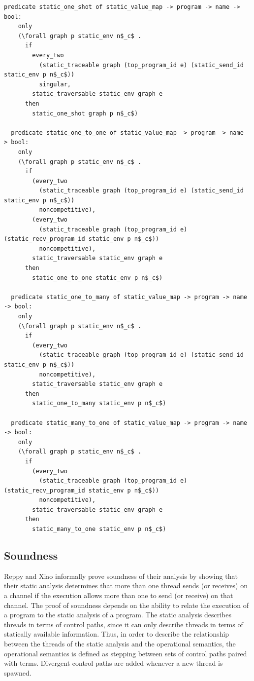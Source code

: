 \documentclass[10pt]{article}
\begin{document}
\begin{lstlisting}[language=logic, mathescape]
  predicate static_one_shot of static_value_map -> program -> name -> bool:
    only
    (\forall graph p static_env n$_c$ .
      if
        every_two
          (static_traceable graph (top_program_id e) (static_send_id static_env p n$_c$))
          singular,
        static_traversable static_env graph e
      then
        static_one_shot graph p n$_c$)

  predicate static_one_to_one of static_value_map -> program -> name -> bool:
    only
    (\forall graph p static_env n$_c$ .
      if
        (every_two
          (static_traceable graph (top_program_id e) (static_send_id static_env p n$_c$))
          noncompetitive), 
        (every_two
          (static_traceable graph (top_program_id e) (static_recv_program_id static_env p n$_c$))
          noncompetitive), 
        static_traversable static_env graph e
      then
        static_one_to_one static_env p n$_c$)

  predicate static_one_to_many of static_value_map -> program -> name -> bool:
    only
    (\forall graph p static_env n$_c$ .
      if
        (every_two
          (static_traceable graph (top_program_id e) (static_send_id static_env p n$_c$))
          noncompetitive),
        static_traversable static_env graph e
      then
        static_one_to_many static_env p n$_c$) 

  predicate static_many_to_one of static_value_map -> program -> name -> bool:
    only
    (\forall graph p static_env n$_c$ .
      if
        (every_two
          (static_traceable graph (top_program_id e) (static_recv_program_id static_env p n$_c$))
          noncompetitive),
        static_traversable static_env graph e
      then
        static_many_to_one static_env p n$_c$) 
\end{lstlisting}

\subsection{Soundness}

Reppy and Xiao informally prove soundness of their analysis by showing that their static analysis
determines that more than one thread sends (or receives) on a channel if the execution allows more
than one to send (or receive) on that channel. The proof of soundness depends on the
ability to relate the execution of a program to the static analysis of a program. The static
analysis describes threads in terms of control paths, since it can only describe threads in
terms of statically available information. Thus, in order to describe the relationship between
the threads of the static analysis and the operational semantics, the operational semantics is
defined as stepping between sets of control paths paired with terms. Divergent control paths
are added whenever a new thread is spawned.
\end{document}
